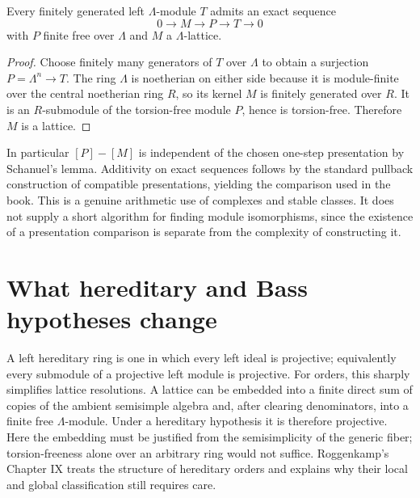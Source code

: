 \begin{proposition}
Every finitely generated left $\Lambda$-module $T$ admits an exact sequence
\[
0\to M\to P\to T\to0
\]
with $P$ finite free over $\Lambda$ and $M$ a $\Lambda$-lattice.
\end{proposition}
\begin{proof}
Choose finitely many generators of $T$ over $\Lambda$ to obtain a surjection $P=\Lambda^n\to T$. The ring $\Lambda$ is noetherian on either side because it is module-finite over the central noetherian ring $R$, so its kernel $M$ is finitely generated over $R$. It is an $R$-submodule of the torsion-free module $P$, hence is torsion-free. Therefore $M$ is a lattice.
\end{proof}

In particular $[P]-[M]$ is independent of the chosen one-step presentation by Schanuel's lemma. Additivity on exact sequences follows by the standard pullback construction of compatible presentations, yielding the comparison used in the book. This is a genuine arithmetic use of complexes and stable classes. It does not supply a short algorithm for finding module isomorphisms, since the existence of a presentation comparison is separate from the complexity of constructing it.

\section{What hereditary and Bass hypotheses change}

A left hereditary ring is one in which every left ideal is projective; equivalently every submodule of a projective left module is projective. For orders, this sharply simplifies lattice resolutions. A lattice can be embedded into a finite direct sum of copies of the ambient semisimple algebra and, after clearing denominators, into a finite free $\Lambda$-module. Under a hereditary hypothesis it is therefore projective. Here the embedding must be justified from the semisimplicity of the generic fiber; torsion-freeness alone over an arbitrary ring would not suffice. Roggenkamp's Chapter IX treats the structure of hereditary orders and explains why their local and global classification still requires care.\cite[Chapter IX, \S2]{v2Roggenkamp1970II}

